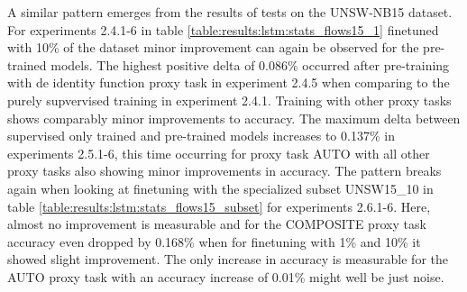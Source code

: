 A similar pattern emerges from the results of tests on the UNSW-NB15 dataset. For experiments 2.4.1-6 in table \ref{table:results:lstm:stats_flows15_1} finetuned with 10\% of the dataset minor improvement can again be observed for the pre-trained models. The highest positive delta of 0.086\% occurred after pre-training with de identity function proxy task in experiment 2.4.5 when comparing to the purely supvervised training in experiment 2.4.1. Training with other proxy tasks shows comparably minor improvements to accuracy. The maximum delta between supervised only trained and pre-trained models increases to 0.137\% in experiments 2.5.1-6, this time occurring for proxy task AUTO with all other proxy tasks also showing minor improvements in accuracy. The pattern breaks again when looking at finetuning with the specialized subset UNSW15\_10 in table \ref{table:results:lstm:stats_flows15_subset} for experiments 2.6.1-6. Here, almost no improvement is measurable and for the COMPOSITE proxy task accuracy even dropped by 0.168\% when for finetuning with 1\% and 10\% it showed slight improvement. The only increase in accuracy is measurable for the AUTO proxy task with an accuracy increase of 0.01\% might well be just noise.

























